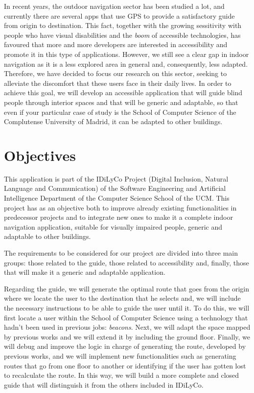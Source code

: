 In recent years, the outdoor navigation sector has been studied a lot, and currently there are several apps that use GPS to provide a satisfactory guide from origin to destination. This fact, together with the growing sessitivity with people who have visual disabilities and the \textit{boom} of accessible technologies, has favoured that more and more developers are interested in accessibility and promote it in this type of applications. However, we still see a clear gap in indoor navigation as it is a less explored area in general and, consequently, less adapted. Therefore, we have decided to focus our research on this sector, seeking to alleviate the discomfort that these users face in their daily lives. In order to achieve this goal, we will develop an accessible application that will guide blind people through interior spaces and that will be generic and adaptable, so that even if your particular case of study is the School of Computer Science of the Complutense University of Madrid, it can be adapted to other buildings. 


\section{Objectives}
\label{sec:objectives}
This application is part of the IDiLyCo Project (Digital Inclusion, Natural Language and Communication) of the
Software Engineering and Artificial Intelligence Department of the Computer Science School of the UCM. This project has
as an objective both to improve already existing functionalities in predecessor projects and to integrate new ones to make it a complete indoor navigation application, suitable for visually impaired people, generic and adaptable to other buildings.

The requirements to be considered for our project are divided into three main groups: those related to the guide, those related to accessibility and, finally, those that will make it a generic and adaptable application.

Regarding the guide, we will generate the optimal route that goes from the origin where we locate the user to the destination that he selects and, we will include the necessary instructions to be able to guide the user until it. To do this, we will first locate a user within the School of Computer Science using a technology that hadn't been used in previous jobs: \textit{beacons}. Next, we will adapt the space mapped by previous works and we will extend it by including the ground floor. Finally, we will debug and improve the logic in charge of generating the route, developed by previous works, and we will implement new functionalities such as generating routes that go from one floor to another or identifying if the user has gotten lost to recalculate the route. In this way, we will build a more complete and closed guide that will distinguish it from the others included in IDiLyCo.

